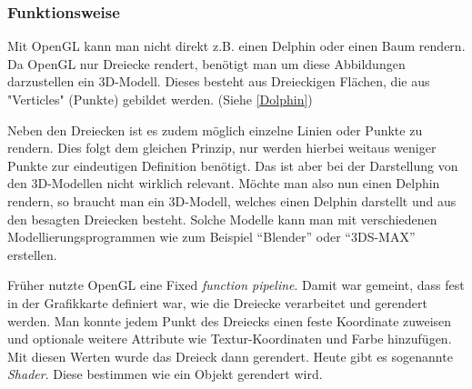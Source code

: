 \subsubsection{Funktionsweise}

Mit OpenGL kann man nicht direkt z.B. einen Delphin oder einen Baum rendern. Da OpenGL nur Dreiecke  rendert, benötigt man um diese Abbildungen darzustellen ein 3D-Modell. Dieses besteht aus Dreieckigen Flächen, die aus "Verticles" (Punkte) gebildet werden. (Siehe \cref{Dolphin})

Neben den Dreiecken ist es zudem möglich einzelne Linien oder Punkte zu rendern. Dies folgt dem gleichen Prinzip, nur werden hierbei weitaus weniger Punkte zur eindeutigen Definition benötigt. Das ist aber bei der Darstellung von den 3D-Modellen nicht wirklich relevant. 
Möchte man also nun einen Delphin rendern, so braucht man ein 3D-Modell, welches einen Delphin darstellt und aus den besagten Dreiecken besteht. Solche Modelle kann man mit verschiedenen Modellierungsprogrammen wie zum Beispiel "`Blender"' oder "`3DS-MAX"' erstellen.

Früher nutzte OpenGL eine Fixed \textit{function pipeline}. Damit war gemeint, dass fest in der Grafikkarte definiert war, wie die Dreiecke verarbeitet und gerendert werden. Man konnte jedem Punkt des Dreiecks einen feste Koordinate %
zuweisen und optionale weitere Attribute wie Textur-Koordinaten und Farbe hinzufügen. Mit diesen Werten wurde das Dreieck dann gerendert. Heute gibt es sogenannte \textit{Shader}. Diese bestimmen wie ein Objekt gerendert wird. 